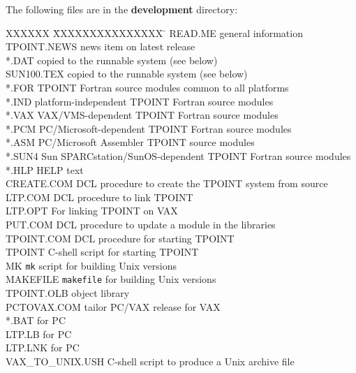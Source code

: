 \goodbreak
The following files are in the {\bf development} directory:
\begin{tabs}
XXXXXX \= XXXXXXXXXXXXXXX \= \kill
\> READ.ME \> general information \\
\> TPOINT.NEWS \> news item on latest release \\
\> *.DAT \> copied to the runnable system (see below) \\
\> SUN100.TEX \> copied to the runnable system (see below) \\
\> *.FOR \> TPOINT Fortran source modules common to all platforms \\
\> *.IND \> platform-independent TPOINT Fortran source modules \\
\> *.VAX \> VAX/VMS-dependent TPOINT Fortran source modules \\
\> *.PCM \> PC/Microsoft-dependent TPOINT Fortran source modules \\
\> *.ASM \> PC/Microsoft Assembler TPOINT source modules \\
\> *.SUN4 \> Sun SPARCstation/SunOS-dependent TPOINT Fortran source modules \\
\> *.HLP \> HELP text \\
\> CREATE.COM \> DCL procedure to create the TPOINT system from source \\
\> LTP.COM \> DCL procedure to link TPOINT \\
\> LTP.OPT \> For linking TPOINT on VAX \\
\> PUT.COM \> DCL procedure to update a module in the libraries \\
\> TPOINT.COM \> DCL procedure for starting TPOINT \\
\> TPOINT \> C-shell script for starting TPOINT \\
\> MK \> \verb|mk| script for building Unix versions \\
\> MAKEFILE \> \verb|makefile| for building Unix versions \\
\> TPOINT.OLB \> object library \\
\> PCTOVAX.COM \> tailor PC/VAX release for VAX \\
\> *.BAT \> for PC \\
\> LTP.LB \> for PC \\
\> LTP.LNK \> for PC \\
\> VAX\_TO\_UNIX.USH \> C-shell script to produce a Unix archive file
\end{tabs}

